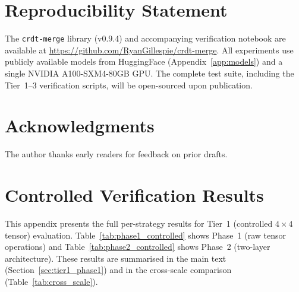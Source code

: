 \documentclass[10pt,letterpaper]{article}
\begin{document}
\section*{Reproducibility Statement}

The \texttt{crdt-merge} library (v0.9.4) and accompanying verification notebook are available at \url{https://github.com/RyanGillespie/crdt-merge}.
All experiments use publicly available models from HuggingFace (Appendix~\ref{app:models}) and a single NVIDIA A100-SXM4-80GB GPU.
The complete test suite, including the Tier~1--3 verification scripts, will be open-sourced upon publication.

\section*{Acknowledgments}

The author thanks early readers for feedback on prior drafts.




\clearpage
\appendix

\section{Controlled Verification Results}\label{app:controlled}

This appendix presents the full per-strategy results for Tier~1 (controlled $4\times 4$ tensor) evaluation.
Table~\ref{tab:phase1_controlled} shows Phase~1 (raw tensor operations) and Table~\ref{tab:phase2_controlled} shows Phase~2 (two-layer architecture).
These results are summarised in the main text (Section~\ref{sec:tier1_phase1}) and in the cross-scale comparison (Table~\ref{tab:cross_scale}).
\end{document}
